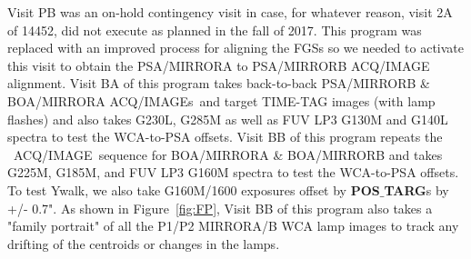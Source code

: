 \documentclass[12pt]{reportj}
\newcommand*{\myfont}{\fontfamily{rm}\selectfont}
\def\acqimage{{\myfont ACQ/IMAGE}\rm}
\def\acqimages{{\myfont ACQ/IMAGE{\rm s}}\rm}
\begin{document}
Visit PB was an on-hold contingency visit in case, for whatever reason, visit 2A of 14452, did not execute as planned in the fall of 2017. This program was replaced with an improved process for aligning the FGSs so we needed to activate this visit to obtain the PSA/MIRRORA to PSA/MIRRORB \acqimage~ alignment.
Visit BA of this program takes back-to-back PSA/MIRRORB \& BOA/MIRRORA \acqimages~and target TIME-TAG images (with lamp flashes) and also takes G230L, G285M as well as FUV LP3 G130M and G140L spectra to test the WCA-to-PSA offsets.
Visit BB of this program repeats the ~\acqimage~sequence for BOA/MIRRORA \& BOA/MIRRORB and takes G225M, G185M, and FUV LP3 G160M spectra to test the WCA-to-PSA offsets. To test Ywalk, we also take G160M/1600 exposures offset by {\bf POS$\_$TARG}s by +/- 0.7".
As shown in Figure~\ref{fig:FP}, Visit BB of this program also takes a "family portrait" of all the P1/P2 MIRRORA/B WCA lamp images to track any drifting of the centroids or changes in the lamps.
\end{document}
